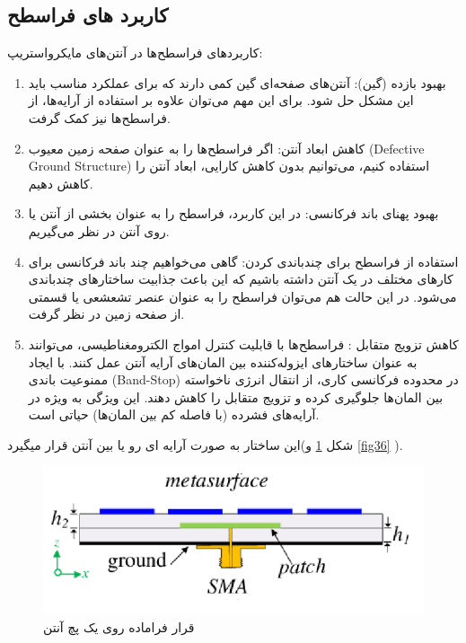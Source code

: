 \subsection{کاربرد های فراسطح}
 کاربردهای فراسطح‌ها در آنتن‌های مایکرواستریپ:
\begin{enumerate}
	\item{
	بهبود بازده (گین): آنتن‌های صفحه‌ای گین کمی دارند که برای عملکرد مناسب باید این مشکل حل شود. برای این مهم می‌توان علاوه بر استفاده از آرایه‌ها، از فراسطح‌ها نیز کمک گرفت.
	}
	\item{
	کاهش ابعاد آنتن: اگر فراسطح‌ها را به عنوان صفحه زمین معیوب (Defective Ground Structure) استفاده کنیم، می‌توانیم بدون کاهش کارایی، ابعاد آنتن را کاهش دهیم.
	}
	\item{
	بهبود پهنای باند فرکانسی: در این کاربرد، فراسطح را به عنوان بخشی از آنتن یا روی آنتن در نظر می‌گیریم.
	}
	\item{
	استفاده از فراسطح برای چندباندی کردن: گاهی می‌خواهیم چند باند فرکانسی برای کارهای مختلف در یک آنتن داشته باشیم که این باعث جذابیت ساختارهای چندباندی می‌شود. در این حالت هم می‌توان فراسطح را به عنوان عنصر تشعشعی یا قسمتی از صفحه زمین در نظر گرفت.
	}
	\item{
	کاهش تزویج متقابل : فراسطح‌ها با قابلیت کنترل امواج الکترومغناطیسی، می‌توانند به عنوان ساختارهای ایزوله‌کننده بین المان‌های آرایه آنتن عمل کنند. با ایجاد ممنوعیت باندی (Band-Stop) در محدوده فرکانسی کاری، از انتقال انرژی ناخواسته بین المان‌ها جلوگیری کرده و تزویج متقابل را کاهش دهند. این ویژگی به ویژه در آرایه‌های فشرده (با فاصله کم بین المان‌ها) حیاتی است.
	}
\end{enumerate}

این ساختار به صورت آرایه ای رو یا بین آنتن قرار میگیرد(شکل
\ref{fig35}
و
\ref{fig36}
).

\begin{figure}
	\centering
	\includegraphics[scale=0.5]{Images/fig35.png}
	\caption{قرار فراماده روی یک پچ آنتن}
	\label{fig35}
\end{figure}

